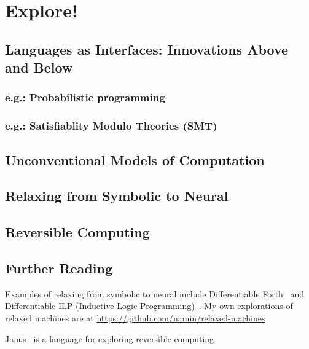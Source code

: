 \chapter{Explore!}

\section{Languages as Interfaces: Innovations Above and Below}
\subsection{e.g.: Probabilistic programming}
\subsection{e.g.: Satisfiablity Modulo Theories (SMT)}

\section{Unconventional Models of Computation}

\section{Relaxing from Symbolic to Neural}

\section{Reversible Computing}

\section{Further Reading}

Examples of relaxing from symbolic to neural include Differentiable Forth~\citep{diffForth} and Differentiable ILP (Inductive Logic Programming)~\citep{diffILP}.
My own explorations of relaxed machines are at \url{https://github.com/namin/relaxed-machines}

Janus~\citep{janus} is a language for exploring reversible computing.
